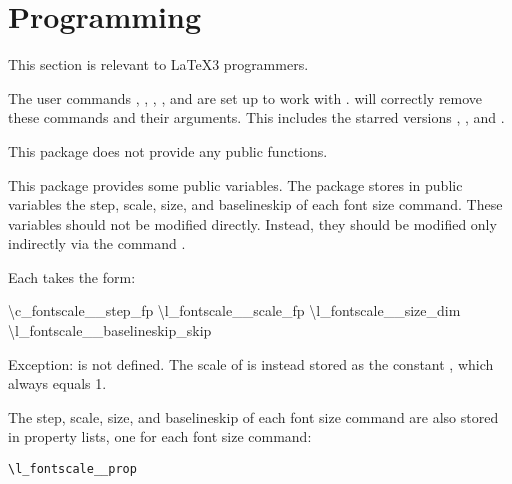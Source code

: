 \documentclass{beery}
\begin{document}
\section{Programming}
\label{sec:programming}

This section is relevant to \LaTeX3 programmers.

The user commands , , , , and  are set up to work with .
 will correctly remove these commands and their arguments.
This includes the starred versions , , and .

This package does not provide any public  functions.

This package provides some public  variables.
The package stores in public variables the step, scale, size, and baselineskip of each font size command.
These variables should not be modified directly.
Instead, they should be modified only indirectly via the command .

Each takes the form:

\begingroup
  \ttfamily
  \textbackslash{}c\_fontscale\_\_step\_fp
  \nopagebreak\newline
  \textbackslash{}l\_fontscale\_\_scale\_fp
  \newline
  \textbackslash{}l\_fontscale\_\_size\_dim
  \nopagebreak\newline
  \textbackslash{}l\_fontscale\_\_baselineskip\_skip
\endgroup

Exception:
 is not defined.
The scale of  is instead stored as the constant , which always equals \num{1}.

The step, scale, size, and baselineskip of each font size command are also stored in property lists, one for each font size command:

\texttt{\textbackslash{}l\_fontscale\_\_prop}
\end{document}

